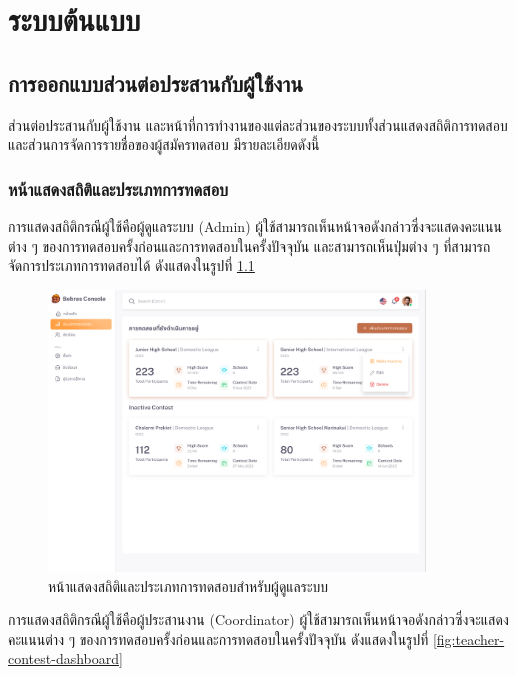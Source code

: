 \chapter{ระบบต้นแบบ}
\label{chapter:result}

\section{การออกแบบส่วนต่อประสานกับผู้ใช้งาน}

ส่วนต่อประสานกับผู้ใช้งาน และหน้าที่การทำงานของแต่ละส่วนของระบบทั้งส่วนแสดงสถิติการทดสอบและส่วนการจัดการรายชื่อของผู้สมัครทดสอบ มีรายละเอียดดังนี้

\subsection{หน้าแสดงสถิติและประเภทการทดสอบ}

การแสดงสถิติกรณีผู้ใช้คือผู้ดูแลระบบ (Admin) ผู้ใช้สามารถเห็นหน้าจอดังกล่าวซึ่งจะแสดงคะแนนต่าง ๆ ของการทดสอบครั้งก่อนและการทดสอบในครั้งปัจจุบัน และสามารถเห็นปุ่มต่าง ๆ ที่สามารถจัดการประเภทการทดสอบได้ ดังแสดงในรูปที่ \ref{fig:admin-contest-dashboard}

\begin{figure}[H]
    \centering
    \includegraphics[width=100mm,scale=1.0]{images/editCon.png}
    \caption{หน้าแสดงสถิติและประเภทการทดสอบสำหรับผู้ดูแลระบบ}
    \label{fig:admin-contest-dashboard}
\end{figure}

การแสดงสถิติกรณีผู้ใช้คือผู้ประสานงาน (Coordinator) ผู้ใช้สามารถเห็นหน้าจอดังกล่าวซึ่งจะแสดงคะแนนต่าง ๆ ของการทดสอบครั้งก่อนและการทดสอบในครั้งปัจจุบัน ดังแสดงในรูปที่ \ref{fig:teacher-contest-dashboard}

